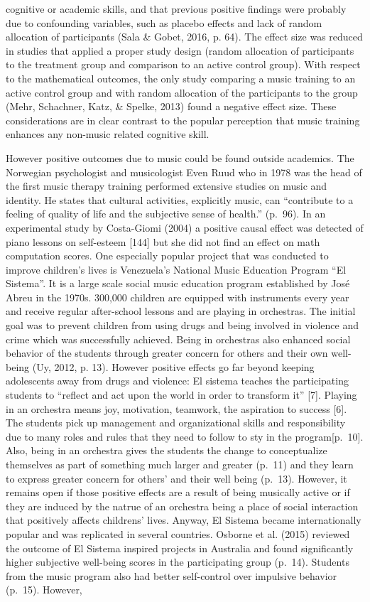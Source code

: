 \documentclass[a4, 12pt]{article}
\begin{document}
cognitive or academic skills, and that previous positive findings were probably due to confounding variables, such as placebo effects and lack of random allocation of participants (Sala \& Gobet, 2016, p. 64). The effect size was reduced in studies that applied a proper study design (random allocation of participants to the treatment group and comparison to an active control group). With respect to the mathematical outcomes, the only study comparing a music training to an active control group and with random allocation of the participants to the group (Mehr, Schachner, Katz, \& Spelke, 2013) found a negative effect size. These considerations are in clear contrast to the popular perception that music training enhances any non-music related cognitive skill.

However positive outcomes due to music could be found outside academics. The Norwegian psychologist and musicologist Even Ruud who in 1978 was the head of the first music therapy training performed extensive studies on music and identity. He states that cultural activities, explicitly music, can ``contribute to a feeling of quality of life and the subjective sense of health.'' (p.~96). In an experimental study by Costa-Giomi (2004) a positive causal effect was detected of piano lessons on self-esteem {[}144{]} but she did not find an effect on math computation scores. One especially popular project that was conducted to improve children's lives is Venezuela's National Music Education Program ``El Sistema''. It is a large scale social music education program established by José Abreu in the 1970s. 300,000 children are equipped with instruments every year and receive regular after-school lessons and are playing in orchestras. The initial goal was to prevent children from using drugs and being involved in violence and crime which was successfully achieved. Being in orchestras also enhanced social behavior of the students through greater concern for others and their own well-being (Uy, 2012, p. 13). However positive effects go far beyond keeping adolescents away from drugs and violence: El sistema teaches the participating students to ``reflect and act upon the world in order to transform it'' {[}7{]}. Playing in an orchestra means joy, motivation, teamwork, the aspiration to success {[}6{]}. The students pick up management and organizational skills and responsibility due to many roles and rules that they need to follow to sty in the program{[}p.~10{]}. Also, being in an orchestra gives the students the change to conceptualize themselves as part of something much larger and greater (p.~11) and they learn to express greater concern for others' and their well being (p.~13). However, it remains open if those positive effects are a result of being musically active or if they are induced by the natrue of an orchestra being a place of social interaction that positively affects childrens' lives. Anyway, El Sistema became internationally popular and was replicated in several countries. Osborne et al. (2015) reviewed the outcome of El Sistema inspired projects in Australia and found significantly higher subjective well-being scores in the participating group (p.~14). Students from the music program also had better self-control over impulsive behavior (p.~15). However, 
\end{document}
